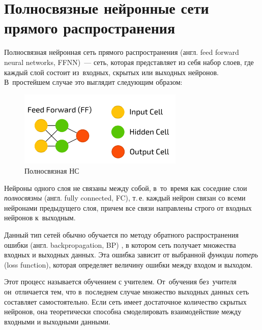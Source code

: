 \section[Полносвязные нейронные сети прямого\\ распространения]{Полносвязные нейронные сети\\ прямого распространения}

Полносвязная нейронная сеть прямого распространения (англ. feed forward neural networks, FFNN)~--- сеть, 
которая представляет из себя
набор слоев, где каждый слой состоит из~входных, скрытых или выходных нейронов. 
В~простейшем случае это выглядит следующим образом:
\begin{figure}[!h]
	\centering
	\includegraphics[width=0.7\textwidth]{pics/FFNN}
	\caption{Полносвязная НС}
	\label{FFNN}
\end{figure}

Нейроны одного слоя не связаны между собой, в~то~время как соседние слои \textit{полносвязны} (англ. fully connected, FC), т.\,е. каждый нейрон связан со всеми 
нейронами предыдущего слоя, причем все связи направлены строго от входных нейронов к~выходным. 

Данный тип сетей обычно обучается по методу обратного распространения ошибки (англ. backpropagation, BP) \cite{backprop}, 
в котором сеть получает множества входных и выходных данных. Эта ошибка 
зависит от выбранной \textit{функции потерь} (loss function), которая определяет величину 
ошибки между входом и выходом. 

Этот процесс называется обучением с учителем.
От~обучения без~учителя он~отличается тем, что в~последнем случае 
множество выходных данных сеть составляет самостоятельно.
Если сеть имеет достаточное количество 
скрытых нейронов, она теоретически способна смоделировать взаимодействие между 
входными и выходными данными.

